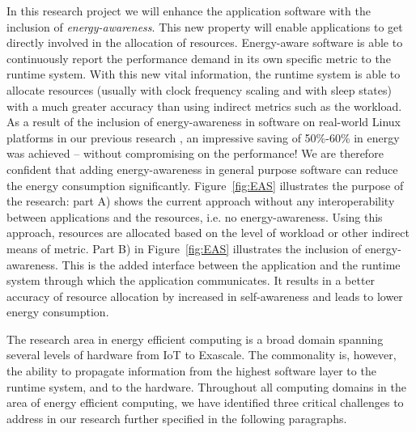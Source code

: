 \documentclass{article}
\begin{document}
In this research project we will enhance the application software with the inclusion of \textit{energy-awareness}.
This new property will enable applications to get directly involved in the allocation of resources.
Energy-aware software is able to continuously report the performance demand in its own specific metric to the runtime system.
With this new vital information, the runtime system is able to allocate resources (usually with clock frequency scaling and with sleep states) with a much greater accuracy than using indirect metrics such as the workload.
As a result of the inclusion of energy-awareness in software on real-world Linux platforms in our previous research \cite{Holmbacka:15}, an impressive saving of 50\%-60\% in energy was achieved -- 
without compromising on the performance!
We are therefore confident that adding energy-awareness in general purpose software can reduce the energy consumption significantly.
Figure~\ref{fig:EAS} illustrates the purpose of the research: part A) shows the current approach without any interoperability between applications and the resources, i.e. no energy-awareness.
Using this approach, resources are allocated based on the level of workload or other indirect means of metric.
Part B) in Figure~\ref{fig:EAS} illustrates the inclusion of energy-awareness. 
This is the added interface between the application and the runtime system through which the application communicates.
It results in a better accuracy of resource allocation by increased in self-awareness and leads to lower energy consumption.\smallskip

The research area in energy efficient computing is a broad domain spanning several levels of hardware from IoT to Exascale.
The commonality is, however, the ability to propagate information from the highest software layer to the runtime system, and to the hardware.
Throughout all computing domains in the area of energy efficient computing, we have identified three critical challenges to address in our research further specified in the following paragraphs.
\end{document}
